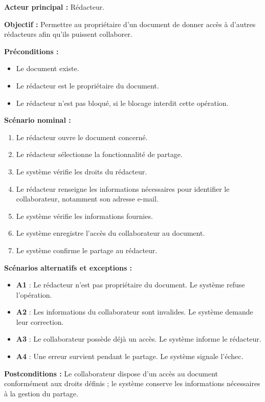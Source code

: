 \begin{description}[leftmargin=0pt, style=nextline, font=\normalfont\bfseries\color{violetprincipal}]
    \textbf{Acteur principal :} Rédacteur.

    \textbf{Objectif :} Permettre au propriétaire d'un document de donner accès à d'autres rédacteurs afin qu'ils puissent collaborer.

    \textbf{Préconditions :}
    \begin{itemize}
        \item Le document existe.
        \item Le rédacteur est le propriétaire du document.
        \item Le rédacteur n'est pas bloqué, si le blocage interdit cette opération.
    \end{itemize}

    \textbf{Scénario nominal :}
    \begin{enumerate}
        \item Le rédacteur ouvre le document concerné.
        \item Le rédacteur sélectionne la fonctionnalité de partage.
        \item Le système vérifie les droits du rédacteur.
        \item Le rédacteur renseigne les informations nécessaires pour identifier le collaborateur, notamment son adresse e-mail.
        \item Le système vérifie les informations fournies.
        \item Le système enregistre l'accès du collaborateur au document.
        \item Le système confirme le partage au rédacteur.
    \end{enumerate}

    \textbf{Scénarios alternatifs et exceptions :}
    \begin{itemize}
        \item \textbf{A1} : Le rédacteur n'est pas propriétaire du document. Le système refuse l'opération.
        \item \textbf{A2} : Les informations du collaborateur sont invalides. Le système demande leur correction.
        \item \textbf{A3} : Le collaborateur possède déjà un accès. Le système informe le rédacteur.
        \item \textbf{A4} : Une erreur survient pendant le partage. Le système signale l'échec.
    \end{itemize}

    \textbf{Postconditions :} Le collaborateur dispose d'un accès au document conformément aux droits définis ; le système conserve les informations nécessaires à la gestion du partage.


\end{description}
